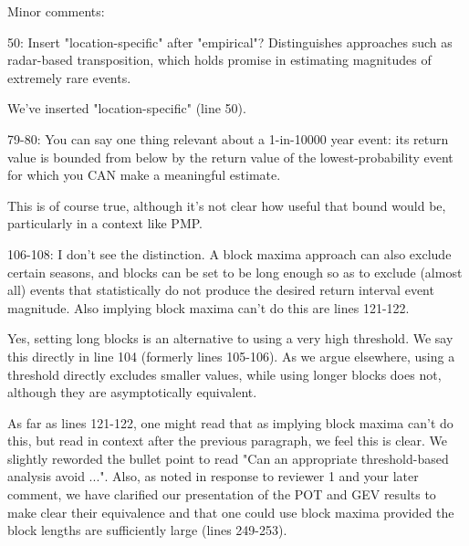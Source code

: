 \documentclass[12pt,english]{reviewresponse}
\begin{document}
Minor comments:

\begin{revcomment}
 50: Insert "location-specific" after "empirical"?  Distinguishes approaches such as radar-based transposition, which holds promise in estimating magnitudes of extremely rare events.
   
\end{revcomment}

\begin{revresponse}
We've inserted "location-specific" (line 50).
   
\end{revresponse}

\begin{revcomment}
   79-80: You can say one thing relevant about a 1-in-10000 year event: its return value is bounded from below by the return value of the lowest-probability event for which you CAN make a meaningful estimate.
 
\end{revcomment}

\begin{revresponse}
This is of course true, although it's not clear how useful that bound would be, particularly in a context like PMP.
\end{revresponse}

\begin{revcomment}
  106-108: I don't see the distinction.  A block maxima approach can also exclude certain seasons, and blocks can be set to be long enough so as to exclude (almost all) events that statistically do not produce the desired return interval event magnitude.  Also implying block maxima can't do this are lines 121-122.
  
\end{revcomment}

\begin{revresponse}
Yes, setting long blocks is an alternative to using a very high threshold. We say this directly in line 104 (formerly lines 105-106). As we argue elsewhere, using a threshold directly excludes smaller values, while using longer blocks does not, although they are asymptotically equivalent.

As far as lines 121-122, one might read that as implying block maxima can't do this, but read in context after the previous paragraph, we feel this is clear. We slightly reworded the bullet point to read "Can an appropriate threshold-based analysis avoid ...". Also, as noted in response to reviewer 1 and your later comment, we have clarified our presentation of the POT and GEV results to make clear their equivalence and that one could use block maxima provided the block lengths are sufficiently large (lines 249-253).
\end{revresponse}
\end{document}
